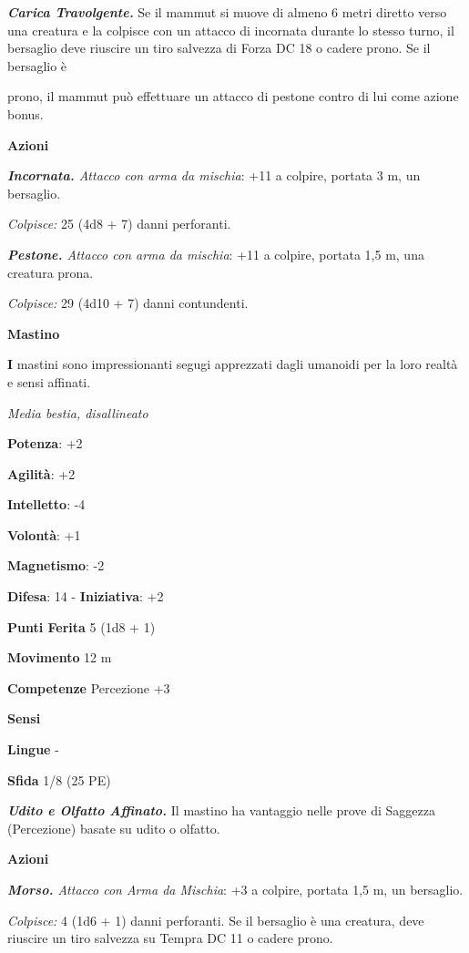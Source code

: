 \begin{multicols}{2}
\emph{\textbf{Carica Travolgente.}} Se il mammut si muove di almeno 6
metri diretto verso una creatura e la colpisce con un attacco di
incornata durante lo stesso turno, il bersaglio deve riuscire un tiro
salvezza di Forza DC 18 o cadere prono. Se il bersaglio è



prono, il mammut può effettuare un attacco di pestone contro di lui come
azione bonus.

\textbf{Azioni}

\emph{\textbf{Incornata.} Attacco con arma da mischia}: +11 a colpire,
portata 3 m, un bersaglio.

\emph{Colpisce:} 25 (4d8 + 7) danni perforanti.

\emph{\textbf{Pestone.} Attacco con arma da mischia}: +11 a colpire,
portata 1,5 m, una creatura prona.

\emph{Colpisce:} 29 (4d10 + 7) danni contundenti.

\textbf{Mastino}

\textbf{I} mastini sono impressionanti segugi apprezzati dagli umanoidi
per la loro realtà e sensi affinati.

\emph{Media bestia, disallineato}

\textbf{Potenza}: +2

\textbf{Agilità}: +2

\textbf{Intelletto}: -4

\textbf{Volontà}: +1

\textbf{Magnetismo}: -2

\textbf{Difesa}: 14 - \textbf{Iniziativa}: +2

\textbf{Punti Ferita} 5 (1d8 + 1)

\textbf{Movimento} 12 m

\textbf{Competenze} Percezione +3

\textbf{Sensi} 

\textbf{Lingue} -

\textbf{Sfida} 1/8 (25 PE)

\emph{\textbf{Udito e Olfatto Affinato.}} Il mastino ha vantaggio nelle
prove di Saggezza (Percezione) basate su udito o olfatto.

\textbf{Azioni}

\emph{\textbf{Morso.} Attacco con Arma da Mischia}: +3 a colpire,
portata 1,5 m, un bersaglio.

\emph{Colpisce:} 4 (1d6 + 1) danni perforanti. Se il bersaglio è una
creatura, deve riuscire un tiro salvezza su Tempra DC 11 o cadere prono.


\end{multicols}
